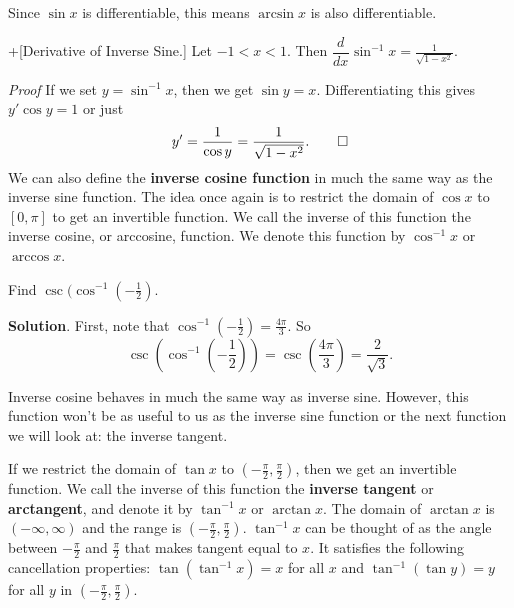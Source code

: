 \documentclass[10pt,]{book}
\makeatletter
\newcommand{\terminology}[1]{\textbf{#1}}
\theoremstyle{ptxplainnotitle}
\theoremstyle{ptxplaintitle}
\theoremstyle{ptxplainnotitle}
\theoremstyle{ptxplaintitle}
\theoremstyle{ptxplainnotitle}
\theoremstyle{ptxplaintitle}
\renewcommand*{\proofname}{Proof}
\renewenvironment{proof}[1][\proofname]{\par
  \pushQED{\qed}%
  \normalfont \topsep6\p@\@plus6\p@\relax
  \trivlist
  \item\relax
    {\itshape
    #1\@addpunct{.}}\hspace\labelsep\ignorespaces
}{%
  \popQED\endtrivlist\@endpefalse
}
\theoremstyle{ptxdefinitionnotitle}
\theoremstyle{ptxdefinitiontitle}
\theoremstyle{ptxdefinitionnotitle}
\theoremstyle{ptxdefinitiontitle}
\theoremstyle{ptxdefinitionnotitle}
\theoremstyle{ptxdefinitiontitle}
\theoremstyle{ptxdefinitionnotitle}
\theoremstyle{ptxdefinitiontitle}
\theoremstyle{ptxdefinitionnotitle}
\theoremstyle{ptxdefinitiontitle}
\numberwithin{equation}{section}
\newcommand{\dv}[3][]{\dfrac{d^{#1} #2}{d #3^{#1}}}
\makeatother
\begin{document}
\hypertarget{p-265}{}%
Since \(\sin x\) is differentiable, this means \(\arcsin x\) is also differentiable.%
\begin{theorem}+[{Derivative of Inverse Sine.}]\label{theorem-derivative-of-inverse-sine}
\hypertarget{p-266}{}%
Let \(-1 < x < 1\). Then \(\dv{}{x}\sin^{-1}x = \frac{1}{\sqrt{1-x^{2}}}\).%
\end{theorem}
\begin{proof}\hypertarget{proof-6}{}
\hypertarget{p-267}{}%
If we set \(y = \sin^{-1}x\), then we get \(\sin y = x\). Differentiating this gives \(y'\cos y = 1\) or just%
\begin{equation*}
y' = \frac{1}{\cos y} = \frac{1}{\sqrt{1-x^{2}}}.\qedhere
\end{equation*}
%
\end{proof}
\hypertarget{p-268}{}%
We can also define the \terminology{inverse cosine function} in much the same way as the inverse sine function. The idea once again is to restrict the domain of \(\cos x\) to \([0,\pi]\) to get an invertible function. We call the inverse of this function the inverse cosine, or arccosine, function. We denote this function by \(\cos^{-1}x\) or \(\arccos x\).%
\begin{example}\label{example-inverse-cosine-value}
\hypertarget{p-269}{}%
Find \(\csc(\cos^{-1}(-\frac{1}{2})\).%
\par\smallskip%
\noindent\textbf{Solution}.\hypertarget{solution-58}{}\quad%
\hypertarget{p-270}{}%
First, note that \(\cos^{-1}(-\frac{1}{2}) = \frac{4\pi}{3}\). So%
\begin{equation*}
\csc(\cos^{-1}(-\frac{1}{2})) = \csc(\frac{4\pi}{3}) = \frac{2}{\sqrt{3}}.
\end{equation*}
%
\end{example}
\hypertarget{p-271}{}%
Inverse cosine behaves in much the same way as inverse sine. However, this function won't be as useful to us as the inverse sine function or the next function we will look at: the inverse tangent.%
\par
\hypertarget{p-272}{}%
If we restrict the domain of \(\tan x\) to \((-\frac{\pi}{2}, \frac{\pi}{2})\), then we get an  invertible function. We call the inverse of this function the \terminology{inverse tangent} or \terminology{arctangent}, and denote it by \(\tan^{-1}x\) or \(\arctan x\). The domain of \(\arctan x\) is \((-\infty,\infty)\) and the range is \((-\frac{\pi}{2},\frac{\pi}{2})\). \(\tan^{-1}x\) can be thought of as the angle between \(-\frac{\pi}{2}\) and \(\frac{\pi}{2}\) that makes tangent equal to \(x\). It satisfies the following cancellation properties: \(\tan(\tan^{-1}x) = x\) for all \(x\) and \(\tan^{-1}(\tan y) = y\) for all \(y\) in \((-\frac{\pi}{2},\frac{\pi}{2})\).%
\end{document}
